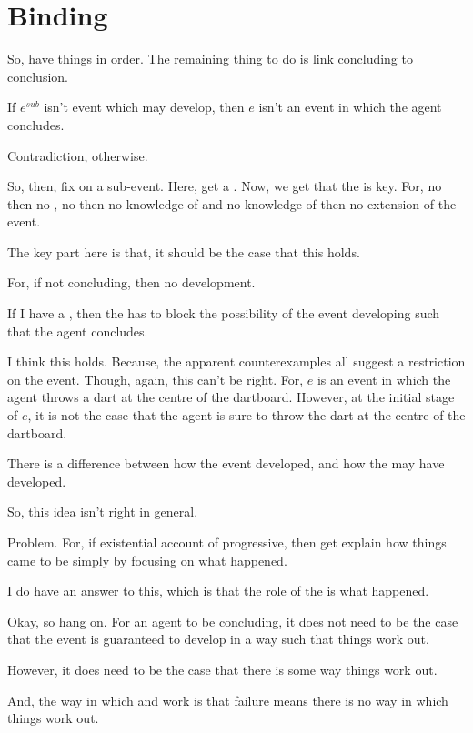 \chapter{Binding}
\label{cha:binding}

\begin{note}
  So, have things in order.
  The remaining thing to do is link concluding to conclusion.

  \begin{idea}
    If \(e^{sub}\) isn't event which may develop, then \(e\) isn't an event in which the agent concludes.
    \begin{argument}
      Contradiction, otherwise.
    \end{argument}
  \end{idea}

  {
    \color{red}
    So, then, fix on a sub-event.
    Here, get a \requ{}.
    Now, we get that the \pevent{} is key.
    For, no \pevent{} then no \fc{}, no \fc{} then no knowledge of \fc{} and no knowledge of \fc{} then no extension of the event.
  }

  The key part here is that, it should be the case that this holds.

  For, if not concluding, then no development.

  If I have a \bCurb{}, then the \bCurb{} has to block the possibility of the event developing such that the agent concludes.

  I think this holds.
  Because, the apparent counterexamples all suggest a restriction on the event.
  Though, again, this can't be right.
  For, \(e\) is an event in which the agent throws a dart at the centre of the dartboard.
  However, at the initial stage of \(e\), it is not the case that the agent is sure to throw the dart at the centre of the dartboard.

  There is a difference between how the event developed, and how the may have developed.

  So, this idea isn't right in general.

  Problem.
  For, if existential account of progressive, then get explain how things came to be simply by focusing on what happened.

  I do have an answer to this, which is that the role of the \fc{} is what happened.

  Okay, so hang on.
  For an agent to be concluding, it does not need to be the case that the event is guaranteed to develop in a way such that things work out.

  However, it does need to be the case that there is some way things work out.

  And, the way in which  and  work is that failure means there is no way in which things work out.
\end{note}

